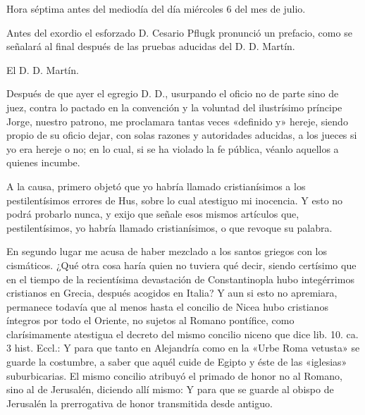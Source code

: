 Hora séptima antes del mediodía del día miércoles 6 del mes de julio.

Antes del exordio el esforzado D. Cesario Pflugk pronunció un prefacio, como se señalará al final después de las pruebas aducidas del D. D. Martín.

El D. D. Martín.

Después de que ayer el egregio D. D., usurpando el oficio no de parte sino de juez, contra lo pactado en la convención y la voluntad del ilustrísimo príncipe Jorge, nuestro patrono, me proclamara tantas veces «definido y» hereje, siendo propio de su oficio dejar, con solas razones y autoridades aducidas, a los jueces si yo era hereje o no; en lo cual, si se ha violado la fe pública, véanlo aquellos a quienes incumbe.

A la causa, primero objetó que yo habría llamado cristianísimos a los pestilentísimos errores de Hus, sobre lo cual atestiguo mi inocencia. Y esto no podrá probarlo nunca, y exijo que señale esos mismos artículos que, pestilentísimos, yo habría llamado cristianísimos, o que revoque su palabra.

En segundo lugar me acusa de haber mezclado a los santos griegos con los cismáticos. ¿Qué otra cosa haría quien no tuviera qué decir, siendo certísimo que en el tiempo de la recientísima devastación de Constantinopla hubo integérrimos cristianos en Grecia, después acogidos en Italia? Y aun si esto no apremiara, permanece todavía que al menos hasta el concilio de Nicea hubo cristianos íntegros por todo el Oriente, no sujetos al Romano pontífice, como clarísimamente atestigua el decreto del mismo concilio niceno que dice lib. 10. ca. 3 hist. Eccl.: Y para que tanto en Alejandría como en la «Urbe Roma vetusta» se guarde la costumbre, a saber que aquél cuide de Egipto y éste de las «iglesias» suburbicarias. El mismo concilio atribuyó el primado de honor no al Romano, sino al de Jerusalén, diciendo allí mismo: Y para que se guarde al obispo de Jerusalén la prerrogativa de honor transmitida desde antiguo.

